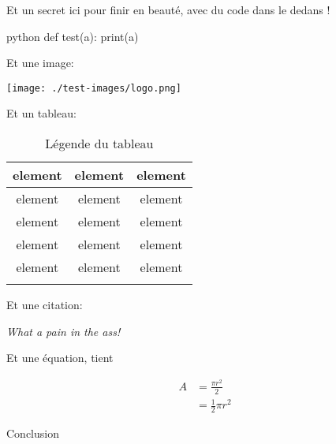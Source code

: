 \documentclass[small]{zmdocument}
\begin{document}
\levelOneConclusion

\begin{Spoiler}
Et un secret ici pour finir en beauté, avec du code dans le dedans !

\begin{CodeBlock}[][1]{python}
def test(a):
    print(a)
\end{CodeBlock}

Et une image:

\begin{center}
\texttt{[image: ./test-images/logo.png]}
\end{center}

Et un tableau:

\begin{longtabu}{|c|c|c|} \hline
element & element & element\\ \hline
element & element & element\\ \hline
element & element & element\\ \hline
element & element & element\\ \hline
element & element & element\\ \hline
\caption{Légende du tableau}
\end{longtabu}

Et une citation:

\begin{Quotation}[me]
\textit{What a pain in the ass!}
\end{Quotation}

Et une équation, tient

\[
\begin{split}
A & = \frac{\pi r^2}{2} \\
 & = \frac{1}{2} \pi r^2
\end{split}
\]

\end{Spoiler}

Conclusion

\end{document}
